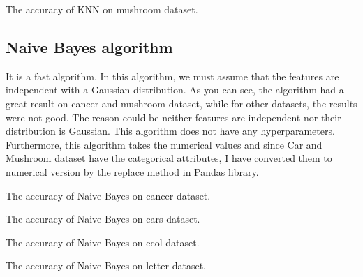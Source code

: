 \begin{table}[H]
\centering
\caption{The accuracy of KNN on mushroom dataset.}
\label{tab:tab_knn_mushroom}

\end{table}











\subsection{Naive Bayes algorithm}

 

It is a fast algorithm. In this algorithm, we must assume that the features are independent with a Gaussian distribution. As you can see, the algorithm had a great result on cancer and mushroom dataset, while for other datasets, the results were not good. The reason could be neither features are independent nor their distribution is Gaussian. This algorithm does not have any hyperparameters. Furthermore, this algorithm takes the numerical values and since Car and Mushroom dataset have the categorical attributes, I have converted them to numerical version by the replace method in Pandas library.    



\begin{table}[H]
\centering
\caption{The accuracy of Naive Bayes on cancer dataset.}
\label{tab:tab_NB_canc}

\end{table}

\begin{table}[H]
\centering
\caption{The accuracy of Naive Bayes on cars dataset.}
\label{tab:tab_NB_cars}

\end{table}

\begin{table}[H]
\centering
\caption{The accuracy of Naive Bayes on ecol dataset.}
\label{tab:tab_NB_ecol}

\end{table}

\begin{table}[H]
\centering
\caption{The accuracy of Naive Bayes on letter dataset.}
\label{tab:tab_NB_letter}

\end{table}

